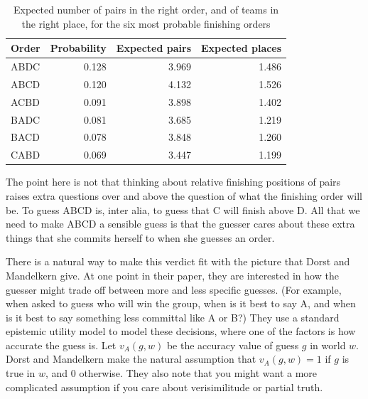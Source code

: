 \documentclass[
  11pt,
  letterpaper,
  DIV=11,
  numbers=noendperiod,
  twoside]{scrartcl}
\begin{document}
{

\begin{longtable}[]{@{}lrrr@{}}

\caption{\label{tbl-pair-match}Expected number of pairs in the right
order, and of teams in the right place, for the six most probable
finishing orders}

\tabularnewline

\toprule\noalign{}
Order & Probability & Expected pairs & Expected places \\
\midrule\noalign{}
\endhead
\bottomrule\noalign{}
\endlastfoot
ABDC & 0.128 & 3.969 & 1.486 \\
ABCD & 0.120 & 4.132 & 1.526 \\
ACBD & 0.091 & 3.898 & 1.402 \\
BADC & 0.081 & 3.685 & 1.219 \\
BACD & 0.078 & 3.848 & 1.260 \\
CABD & 0.069 & 3.447 & 1.199 \\

\end{longtable}

}

The point here is not that thinking about relative finishing positions
of pairs raises extra questions over and above the question of what the
finishing order will be. To guess ABCD is, inter alia, to guess that C
will finish above D. All that we need to make ABCD a sensible guess is
that the guesser cares about these extra things that she commits herself
to when she guesses an order.

There is a natural way to make this verdict fit with the picture that
Dorst and Mandelkern give. At one point in their paper, they are
interested in how the guesser might trade off between more and less
specific guesses. (For example, when asked to guess who will win the
group, when is it best to say A, and when is it best to say something
less committal like A or B?) They use a standard epistemic utility model
to model these decisions, where one of the factors is how accurate the
guess is. Let \(v_A(g, w)\) be the accuracy value of guess \(g\) in
world \(w\). Dorst and Mandelkern make the natural assumption that
\(v_A(g, w) = 1\) if \(g\) is true in \(w\), and 0 otherwise. They also
note that you might want a more complicated assumption if you care about
verisimilitude or partial truth.
\end{document}
